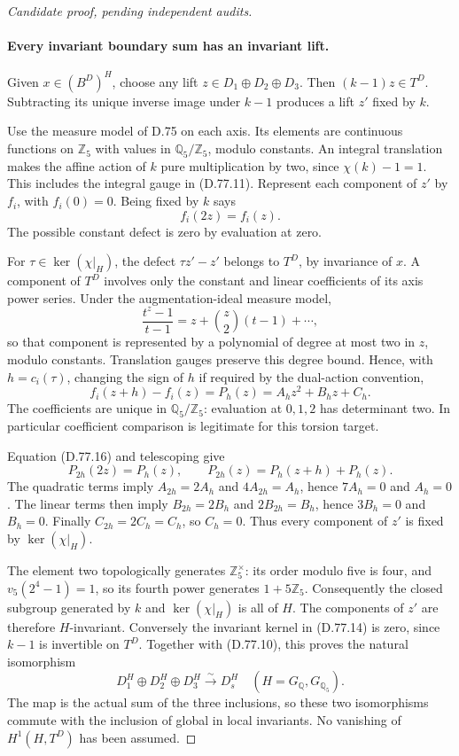 \begin{proof}[Candidate proof, pending independent audits]
\paragraph{Every invariant boundary sum has an invariant lift.}
Given \(x\in(B^D)^H\), choose any lift
\(z\in D_1\oplus D_2\oplus D_3\). Then \((k-1)z\in T^D\).
Subtracting its unique inverse image under \(k-1\) produces
a lift \(z'\) fixed by \(k\).

Use the measure model of D.75 on each axis. Its elements are
continuous functions on \(\mathbb Z_5\) with values in
\(\mathbb Q_5/\mathbb Z_5\), modulo constants. An integral
translation makes the affine action of \(k\) pure multiplication
by two, since \(\chi(k)-1=1\). This includes the integral gauge
in (D.77.11). Represent each component of \(z'\) by \(f_i\),
with \(f_i(0)=0\). Being fixed by \(k\) says
\[
                              f_i(2z)=f_i(z).           \tag{D.77.16}
\]
The possible constant defect is zero by evaluation at zero.

For \(\tau\in\ker(\chi|_H)\), the defect \(\tau z'-z'\)
belongs to \(T^D\), by invariance of \(x\). A component of \(T^D\)
involves only the constant and linear coefficients of its axis
power series. Under the augmentation-ideal measure model,
\[
 \frac{t^z-1}{t-1}=z+\binom z2(t-1)+\cdots,
\]
so that component is represented by a polynomial of degree at
most two in \(z\), modulo constants. Translation gauges preserve
this degree bound. Hence, with \(h=c_i(\tau)\), changing the sign
of \(h\) if required by the dual-action convention,
\[
 f_i(z+h)-f_i(z)=P_h(z)=A_hz^2+B_hz+C_h.                 \tag{D.77.17}
\]
The coefficients are unique in \(\mathbb Q_5/\mathbb Z_5\):
evaluation at \(0,1,2\) has determinant two. In particular
coefficient comparison is legitimate for this torsion target.

Equation (D.77.16) and telescoping give
\[
 P_{2h}(2z)=P_h(z),\qquad P_{2h}(z)=P_h(z+h)+P_h(z).
\]
The quadratic terms imply \(A_{2h}=2A_h\) and
\(4A_{2h}=A_h\), hence \(7A_h=0\) and \(A_h=0\).
The linear terms then imply \(B_{2h}=2B_h\) and
\(2B_{2h}=B_h\), hence \(3B_h=0\) and \(B_h=0\).
Finally \(C_{2h}=2C_h=C_h\), so \(C_h=0\).
Thus every component of \(z'\) is fixed by \(\ker(\chi|_H)\).

The element two topologically generates \(\mathbb Z_5^\times\):
its order modulo five is four, and \(v_5(2^4-1)=1\), so its
fourth power generates \(1+5\mathbb Z_5\).
Consequently the closed subgroup generated by \(k\) and
\(\ker(\chi|_H)\) is all of \(H\). The components of \(z'\)
are therefore \(H\)-invariant. Conversely the invariant kernel
in (D.77.14) is zero, since \(k-1\) is invertible on \(T^D\).
Together with (D.77.10), this proves the natural isomorphism
\[
 D_1^H\oplus D_2^H\oplus D_3^H
                  \xrightarrow{\ \sim\ }D_s^H
       \quad(H=G_{\mathbb Q},G_{\mathbb Q_5}).           \tag{D.77.18}
\]
The map is the actual sum of the three inclusions, so these two
isomorphisms commute with the inclusion of global in local
invariants. No vanishing of \(H^1(H,T^D)\) has been assumed.


\end{proof}
